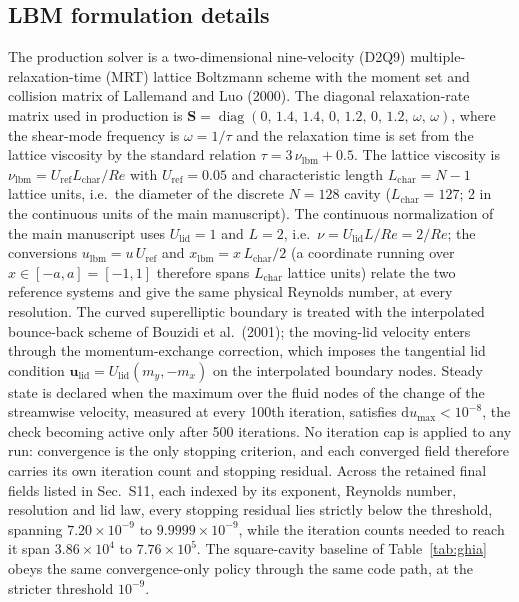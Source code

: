 \documentclass[11pt]{article}
\begin{document}
\subsection{LBM formulation details}
The production solver is a two-dimensional nine-velocity (D2Q9) multiple-relaxation-time
(MRT) lattice Boltzmann scheme with the moment set and collision matrix of
Lallemand and Luo (2000). The diagonal relaxation-rate matrix used in
production is
$\mathbf{S}=\operatorname{diag}(0,\,1.4,\,1.4,\,0,\,1.2,\,0,\,1.2,\,\omega,\,\omega)$,
where the shear-mode frequency is $\omega=1/\tau$ and the relaxation time is
set from the lattice viscosity by the standard relation
$\tau=3\,\nu_{\mathrm{lbm}}+0.5$. The lattice viscosity is
$\nu_{\mathrm{lbm}}=U_{\mathrm{ref}}L_{\mathrm{char}}/Re$ with
$U_{\mathrm{ref}}=0.05$ and characteristic length $L_{\mathrm{char}}=N-1$
lattice units, i.e.\ the diameter of the discrete $N=128$ cavity
($L_{\mathrm{char}}=127$; 2 in the continuous units of the main manuscript).
The continuous normalization of the
main manuscript uses $U_{\mathrm{lid}}=1$ and $L=2$, i.e.\
$\nu=U_{\mathrm{lid}}L/Re=2/Re$; the conversions
$u_{\mathrm{lbm}}=u\,U_{\mathrm{ref}}$ and
$x_{\mathrm{lbm}}=x\,L_{\mathrm{char}}/2$ (a coordinate running over
$x\in[-a,a]=[-1,1]$ therefore spans $L_{\mathrm{char}}$ lattice units)
relate the two reference systems and
give the same physical Reynolds number, at every resolution. The curved superelliptic
boundary is treated with the interpolated bounce-back scheme of Bouzidi et
al.\ (2001); the moving-lid velocity enters through the momentum-exchange
correction, which imposes the tangential lid condition
$\mathbf{u}_{\mathrm{lid}}=U_{\mathrm{lid}}(m_y,-m_x)$ on the interpolated
boundary nodes. Steady state is declared when the maximum over the fluid
nodes of the change of the streamwise velocity, measured at every 100th
iteration, satisfies
$\mathrm{d}u_{\max}<10^{-8}$, the check becoming active only after 500
iterations. No iteration cap is applied to any run: convergence is the only
stopping criterion, and each converged field therefore carries its own
iteration count and stopping residual. Across the retained final fields listed in Sec.~S11, each indexed by
its exponent, Reynolds number, resolution and lid law, every stopping residual
lies strictly below the threshold, spanning $7.20\times10^{-9}$ to
$9.9999\times10^{-9}$, while the iteration counts needed to reach it span
$3.86\times10^{4}$ to $7.76\times10^{5}$. The square-cavity baseline of
Table~\ref{tab:ghia} obeys the same convergence-only policy through the same
code path, at the stricter threshold $10^{-9}$.
\end{document}
